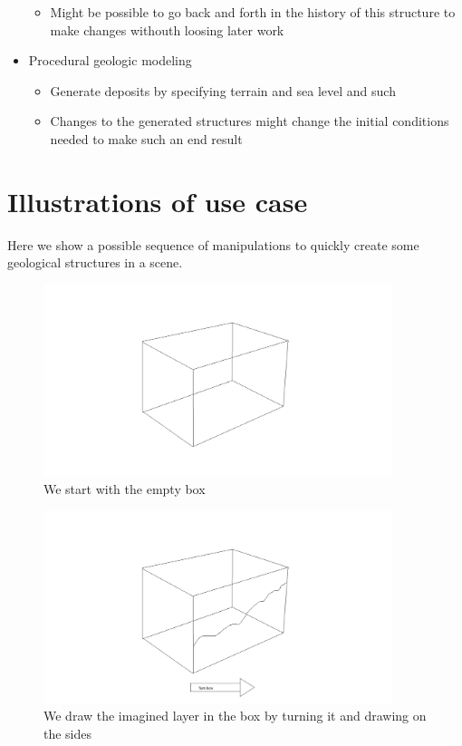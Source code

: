 \documentclass[12pt,a4paper]{article}
\begin{document}
\begin{itemize}
\begin{itemize}
     \item Might be possible to go back and forth in the history of this structure to make changes withouth loosing later work
    \end{itemize}
\item Procedural geologic modeling
    \begin{itemize}
     \item Generate deposits by specifying terrain and sea level and such
     \item Changes to the generated structures might change the initial conditions needed to make such an end result
    \end{itemize}
\end{itemize}


\section*{Illustrations of use case}
Here we show a possible sequence of manipulations to  quickly create some geological structures in a scene.
\begin{figure}
\centering
\includegraphics[width=4in]{box}
\caption[]{
  \footnotesize
  We start with the empty box
  \label{fig:box}
}
\end{figure}

\begin{figure}
\centering
\includegraphics[width=4in]{turnBox}
\caption[]{
  \footnotesize
  We draw the imagined layer in the box by turning it and drawing on the sides
  \label{fig:turnBox}
}
\end{figure}
\end{document}
